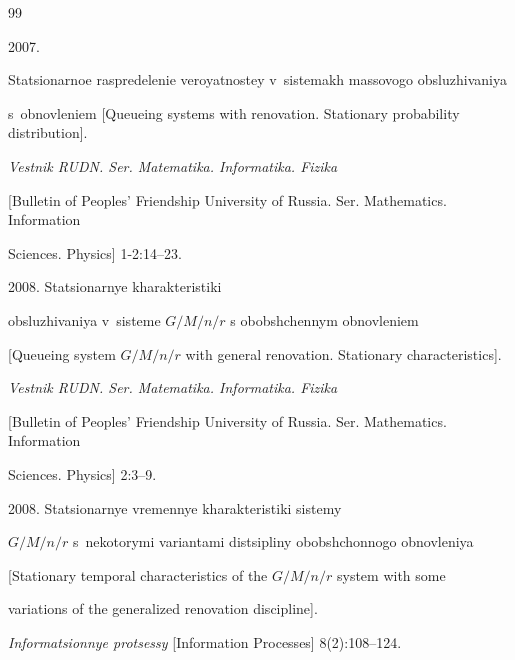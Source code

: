 {\small\frenchspacing

{%


\begin{thebibliography}{99}




 2007.

Statsionarnoe raspredelenie ve\-ro\-yat\-nostey v~sistemakh massovogo obsluzhivaniya 

s~obnovleniem [Queueing systems with renovation. Stationary probability distribution].

\textit{Vestnik RUDN. Ser. Matematika. Informatika. Fizika}

[Bulletin of Peoples' Friendship University of Russia. Ser. Mathematics. Information

Sciences. Physics] 1-2:14--23.






 2008. Statsionarnye kharakteristiki 

obsluzhivaniya v~sisteme $G/M/n/r$ s obobshchennym obnovleniem

 [Queueing system $G/M/n/r$ with general renovation. Stationary characteristics].

\textit{Vestnik RUDN. Ser. Matematika. Informatika. Fizika}

[Bulletin of Peoples' Friendship University of Russia. Ser. Mathematics. Information

Sciences. Physics] 2:3--9. 










 2008. Statsionarnye vremennye kharakteristiki sistemy 

${G/M/n/r}$ s~nekotorymi variantami distsipliny obobshchonnogo obnovleniya 

[Stationary temporal characteristics of the $G/M/n/r$ system with some 

variations of the generalized renovation discipline].

\textit{Informatsionnye protsessy} [Information Processes] 8(2):108--124. 




\end{thebibliography}}}
